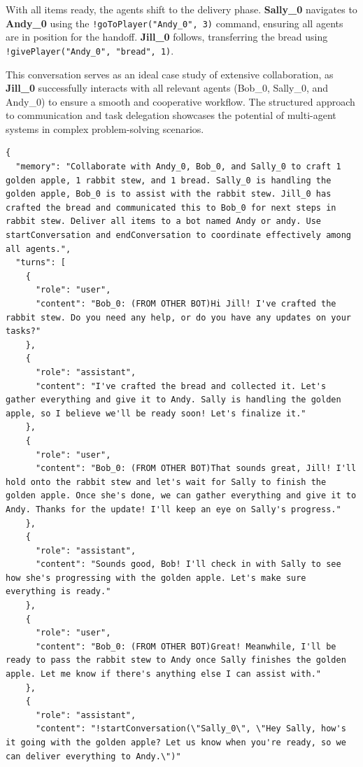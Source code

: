 \documentclass{article}
\begin{document}
With all items ready, the agents shift to the delivery phase. \textbf{Sally\_0} navigates to \textbf{Andy\_0} using the \texttt{!goToPlayer("Andy\_0", 3)} command, ensuring all agents are in position for the handoff. \textbf{Jill\_0} follows, transferring the bread using \texttt{!givePlayer("Andy\_0", "bread", 1)}.

This conversation serves as an ideal case study of extensive collaboration, as \textbf{Jill\_0} successfully interacts with all relevant agents (Bob\_0, Sally\_0, and Andy\_0) to ensure a smooth and cooperative workflow. The structured approach to communication and task delegation showcases the potential of multi-agent systems in complex problem-solving scenarios.

\begin{lstlisting}
{
  "memory": "Collaborate with Andy_0, Bob_0, and Sally_0 to craft 1 golden apple, 1 rabbit stew, and 1 bread. Sally_0 is handling the golden apple, Bob_0 is to assist with the rabbit stew. Jill_0 has crafted the bread and communicated this to Bob_0 for next steps in rabbit stew. Deliver all items to a bot named Andy or andy. Use startConversation and endConversation to coordinate effectively among all agents.",
  "turns": [
    {
      "role": "user",
      "content": "Bob_0: (FROM OTHER BOT)Hi Jill! I've crafted the rabbit stew. Do you need any help, or do you have any updates on your tasks?"
    },
    {
      "role": "assistant",
      "content": "I've crafted the bread and collected it. Let's gather everything and give it to Andy. Sally is handling the golden apple, so I believe we'll be ready soon! Let's finalize it."
    },
    {
      "role": "user",
      "content": "Bob_0: (FROM OTHER BOT)That sounds great, Jill! I'll hold onto the rabbit stew and let's wait for Sally to finish the golden apple. Once she's done, we can gather everything and give it to Andy. Thanks for the update! I'll keep an eye on Sally's progress."
    },
    {
      "role": "assistant",
      "content": "Sounds good, Bob! I'll check in with Sally to see how she's progressing with the golden apple. Let's make sure everything is ready."
    },
    {
      "role": "user",
      "content": "Bob_0: (FROM OTHER BOT)Great! Meanwhile, I'll be ready to pass the rabbit stew to Andy once Sally finishes the golden apple. Let me know if there's anything else I can assist with."
    },
    {
      "role": "assistant",
      "content": "!startConversation(\"Sally_0\", \"Hey Sally, how's it going with the golden apple? Let us know when you're ready, so we can deliver everything to Andy.\")"

\end{lstlisting}
\end{document}
